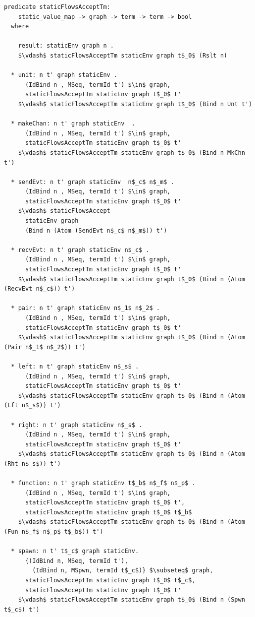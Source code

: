 \documentclass[letterpaper, 11pt]{report}
\begin{document}
\begin{lstlisting}[language=logic, mathescape]
  predicate staticFlowsAcceptTm:
    static_value_map -> graph -> term -> term -> bool
  where

    result: staticEnv graph n .
    $\vdash$ staticFlowsAcceptTm staticEnv graph t$_0$ (Rslt n)

  * unit: n t' graph staticEnv .
      (IdBind n , MSeq, termId t') $\in$ graph,
      staticFlowsAcceptTm staticEnv graph t$_0$ t'
    $\vdash$ staticFlowsAcceptTm staticEnv graph t$_0$ (Bind n Unt t')

  * makeChan: n t' graph staticEnv  .
      (IdBind n , MSeq, termId t') $\in$ graph,
      staticFlowsAcceptTm staticEnv graph t$_0$ t'
    $\vdash$ staticFlowsAcceptTm staticEnv graph t$_0$ (Bind n MkChn t')

  * sendEvt: n t' graph staticEnv  n$_c$ n$_m$ .
      (IdBind n , MSeq, termId t') $\in$ graph,
      staticFlowsAcceptTm staticEnv graph t$_0$ t'
    $\vdash$ staticFlowsAccept
      staticEnv graph
      (Bind n (Atom (SendEvt n$_c$ n$_m$)) t')

  * recvEvt: n t' graph staticEnv n$_c$ .
      (IdBind n , MSeq, termId t') $\in$ graph,
      staticFlowsAcceptTm staticEnv graph t$_0$ t'
    $\vdash$ staticFlowsAcceptTm staticEnv graph t$_0$ (Bind n (Atom (RecvEvt n$_c$)) t')

  * pair: n t' graph staticEnv n$_1$ n$_2$ .
      (IdBind n , MSeq, termId t') $\in$ graph,
      staticFlowsAcceptTm staticEnv graph t$_0$ t'
    $\vdash$ staticFlowsAcceptTm staticEnv graph t$_0$ (Bind n (Atom (Pair n$_1$ n$_2$)) t')

  * left: n t' graph staticEnv n$_s$ .
      (IdBind n , MSeq, termId t') $\in$ graph,
      staticFlowsAcceptTm staticEnv graph t$_0$ t'
    $\vdash$ staticFlowsAcceptTm staticEnv graph t$_0$ (Bind n (Atom (Lft n$_s$)) t')

  * right: n t' graph staticEnv n$_s$ .
      (IdBind n , MSeq, termId t') $\in$ graph,
      staticFlowsAcceptTm staticEnv graph t$_0$ t'
    $\vdash$ staticFlowsAcceptTm staticEnv graph t$_0$ (Bind n (Atom (Rht n$_s$)) t')

  * function: n t' graph staticEnv t$_b$ n$_f$ n$_p$ .
      (IdBind n , MSeq, termId t') $\in$ graph,
      staticFlowsAcceptTm staticEnv graph t$_0$ t',
      staticFlowsAcceptTm staticEnv graph t$_0$ t$_b$
    $\vdash$ staticFlowsAcceptTm staticEnv graph t$_0$ (Bind n (Atom (Fun n$_f$ n$_p$ t$_b$)) t')

  * spawn: n t' t$_c$ graph staticEnv.
      {(IdBind n, MSeq, termId t'),
        (IdBind n, MSpwn, termId t$_c$)} $\subseteq$ graph,
      staticFlowsAcceptTm staticEnv graph t$_0$ t$_c$,
      staticFlowsAcceptTm staticEnv graph t$_0$ t'
    $\vdash$ staticFlowsAcceptTm staticEnv graph t$_0$ (Bind n (Spwn t$_c$) t')


\end{lstlisting}
\end{document}
